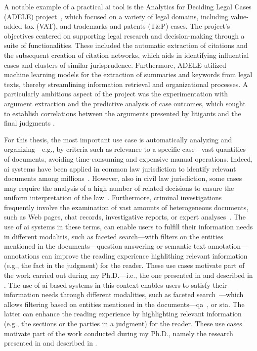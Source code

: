 A notable example of a practical \ac{ai} tool is the Analytics for Deciding Legal Cases (ADELE) project~\cite{galli2024analytics}, which focused on a variety of legal domains, including value-added tax (VAT), and trademarks and patents (T\&P) cases. The project's objectives centered on supporting legal research and decision-making through a suite of functionalities. These included the automatic extraction of citations and the subsequent creation of citation networks, which aids in identifying influential cases and clusters of similar jurisprudence. Furthermore, ADELE utilized machine learning models for the extraction of summaries and keywords from legal texts, thereby streamlining information retrieval and organizational processes. A particularly ambitious aspect of the project was the experimentation with argument extraction and the predictive analysis of case outcomes, which sought to establish correlations between the arguments presented by litigants and the final judgments \cite{juliahb2024}.

For this thesis, the most important use case is automatically analyzing and organizing---e.g., by criteria such as relevance to a specific case---vast quantities of documents, avoiding time-consuming and expensive manual operations. Indeed, \ac{ai} systems have been applied in common law jurisdiction to identify relevant documents among millions~\cite{juliahb2024}. However, also in civil law jurisdiction, some cases may require the analysis of a high number of related decisions to ensure the uniform interpretation of the law~\cite{egea2024does}. Furthermore, criminal investigations frequently involve the examination of vast amounts of heterogeneous documents, such as Web pages, chat records, investigative reports, or expert analyses~\cite{szekely2015building,real_batini2021semantic,pozzi_wise_2025}. The use of \ac{ai} systems in these terms, can enable users to fulfill their information needs in different modalitis, such as faceted search---with filters on the entities mentioned in the documents---question answering or semantic text annotation---annotations can improve the reading experience highlithing relevant information (e.g., the fact in the judgment) for the reader. These use cases motivate part of the work carried out during my Ph.D.---i.e., the one presented in \textcite{pozzi_wise_2025,BELLANDI2024,aixia_2023} and described in .
The use of \ac{ai}-based systems in this context enables users to satisfy their information needs through different modalities, such as faceted search~\cite{kejriwal2017searchengine}---which allows filtering based on entities mentioned in the documents---\acl{qa}~\cite{hoppe_2021_legalqa_german,sovrano2020legal}, or \acl{sta}. The latter can enhance the reading experience by highlighting relevant information (e.g., the sections or the parties in a judgment) for the reader. These use cases motivate part of the work conducted during my Ph.D., namely the research presented in \textcite{pozzi_wise_2025,BELLANDI2024,aixia_2023} and described in .



